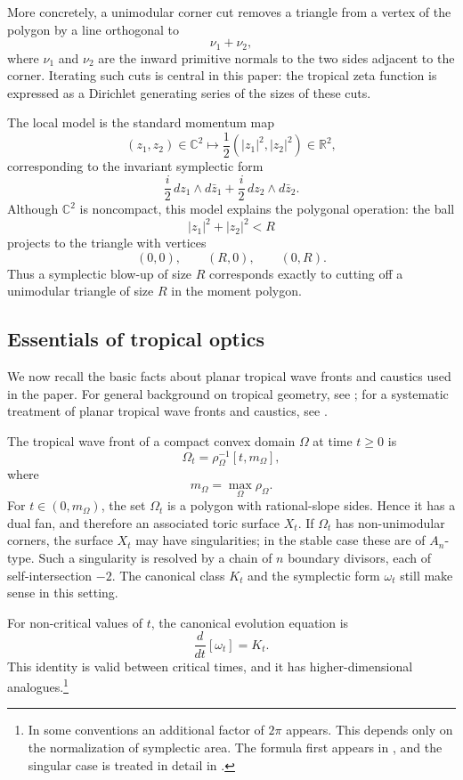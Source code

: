 \documentclass[a4paper,american,11pt]{amsart}
\theoremstyle{plain}
\theoremstyle{definition}
\newcommand{\R}{\mathbb R}
\newcommand{\C}{\mathbb C}
\begin{document}
More concretely, a unimodular corner cut removes a triangle from a vertex of
the polygon by a line orthogonal to
\[
\nu_1+\nu_2,
\]
where \(\nu_1\) and \(\nu_2\) are the inward primitive normals to the two
sides adjacent to the corner.  Iterating such cuts is central in this paper:
the tropical zeta function is expressed as a Dirichlet generating series of
the sizes of these cuts.

The local model is the standard momentum map
\[
(z_1,z_2)\in\C^2
\longmapsto
\frac12(|z_1|^2,|z_2|^2)\in\R^2,
\]
corresponding to the invariant symplectic form
\[
\frac{i}{2}\,dz_1\wedge d\bar z_1+\frac{i}{2}\,dz_2\wedge d\bar z_2.
\]
Although \(\C^2\) is noncompact, this model explains the polygonal operation:
the ball
\[
|z_1|^2+|z_2|^2<R
\]
projects to the triangle with vertices
\[
(0,0),\qquad (R,0),\qquad (0,R).
\]
Thus a symplectic blow-up of size \(R\) corresponds exactly to cutting off a
unimodular triangle of size \(R\) in the moment polygon.

\subsection{Essentials of tropical optics}\label{ssec:tropop}

We now recall the basic facts about planar tropical wave fronts and caustics
used in the paper. For general background on tropical geometry, see
\cite{BriefIntroTropGeom}; for a systematic treatment of planar tropical wave
fronts and caustics, see
\cite{MikhalkinShkolnikov2023WaveFrontsCaustics}.

The tropical wave front of a compact convex domain \(\Omega\) at time
\(t\ge0\) is
\[
\Omega_t=\rho_\Omega^{-1}[t,m_\Omega],
\]
where
\[
m_\Omega=\max_\Omega \rho_\Omega.
\]
For \(t\in(0,m_\Omega)\), the set \(\Omega_t\) is a polygon with
rational-slope sides.  Hence it has a dual fan, and therefore an associated
toric surface \(X_t\).  If \(\Omega_t\) has non-unimodular corners, the
surface \(X_t\) may have singularities; in the stable case these are of
\(A_n\)-type.  Such a singularity is resolved by a chain of \(n\) boundary
divisors, each of self-intersection \(-2\).  The canonical class \(K_t\) and
the symplectic form \(\omega_t\) still make sense in this setting.

For non-critical values of \(t\), the canonical evolution equation is
\begin{equation}\label{eq:canevol}
\frac{d}{dt}[\omega_t]=K_t.
\end{equation}
This identity is valid between critical times, and it has higher-dimensional
analogues.\footnote{In some conventions an additional factor of \(2\pi\)
appears.  This depends only on the normalization of symplectic area.  The
formula first appears in \cite{Shkolnikov17Theis}, and the singular case is
treated in detail in \cite{MikhalkinShkolnikov2023WaveFrontsCaustics}.}
\end{document}
